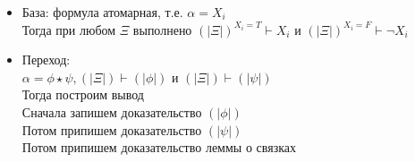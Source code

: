 \documentclass[12pt]{article}
\begin{document}
\begin{itemize}
    \item База: формула атомарная, т.е. $\alpha = X_i$\\
    Тогда при любом $\Xi$ выполнено $(|\Xi|)^{X_i=T}\vdash X_i$ и $(|\Xi|)^{X_i=F}\vdash \lnot X_i$
    \item Переход:\\
    $\alpha = \phi \star \psi, (|\Xi|) \vdash (|\phi|)$ и $(|\Xi|) \vdash (|\psi|)$\\
    Тогда построим вывод\\
    Сначала запишем доказательство $(|\phi|)$\\
    Потом припишем доказательство $(|\psi|)$\\
    Потом припишем доказательство леммы о связках
\end{itemize}
\end{document}
